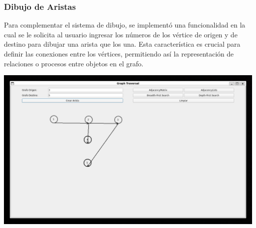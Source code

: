 \documentclass[conference]{IEEEtran}
\begin{document}
\subsubsection{\textbf{Dibujo de Aristas}}
Para complementar el sistema de dibujo, se implementó una funcionalidad en la cual se le solicita al usuario ingresar los números de los vértice de origen y de destino para dibujar una arista que los una. Esta característica es crucial para definir las conexiones entre los vértices, permitiendo así la representación de relaciones o procesos entre objetos en el grafo.
\begin{center}
    \includegraphics[width=\linewidth]{img/Aristas.png}
\end{center}
\end{document}
